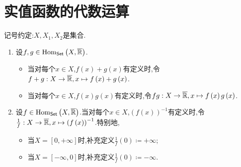 \section{实值函数的代数运算}

记号约定:$X,X_{1},X_{2}$是集合.

\begin{definition}{}{}
	\begin{enumerate}
		\item 设$f,g\in\operatorname{Hom}_{\mathsf{Set}}\left(X,\overline{\mathbb{R}}\right)$.
		\begin{itemize}
			\item 当对每个$x\in X$,$f\left(x\right)+g\left(x\right)$有定义时,令$f+g:X\to\overline{\mathbb{R}},x\mapsto f\left(x\right)+g\left(x\right)$.
			\item 当对每个$x\in X$,$f\left(x\right)g\left(x\right)$有定义时,令$fg:X\to\overline{\mathbb{R}},x\mapsto f\left(x\right)g\left(x\right)$.
		\end{itemize}
		\item 设$f\in\operatorname{Hom}_{\mathsf{Set}}\left(X,\overline{\mathbb{R}}\right)$.当对每个$x\in X$,$\left(f\left(x\right)\right)^{-1}$有定义时,令$\frac{1}{f}:X\to\overline{\mathbb{R}},x\mapsto\left(f\left(x\right)\right)^{-1}$.特别地,
		\begin{itemize}
			\item 当$X=\left[0,+\infty\right]$时,补充定义$\frac{1}{f}\left(0\right)\coloneq +\infty$;
			\item 当$X=\left[-\infty,0\right]$时,补充定义$\frac{1}{f}\left(0\right)\coloneq -\infty$.
		\end{itemize}
	\end{enumerate}
\end{definition}

